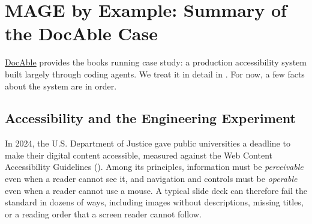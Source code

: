 



\chapter{MAGE by Example: Summary of the DocAble Case}


\href{\%7B\%7Bproduct_url\%7D\%7D}{DocAble} provides the book\textquotesingle s running case study: a production accessibility system built largely through coding agents. We treat it in detail in . For now, a few facts about the system are in order.

\section{Accessibility and the Engineering Experiment}\label{heading:accessibility-and-the-engineering-experiment}



In 2024, the U.S. Department of Justice gave public universities a deadline to make their digital content accessible, measured against the Web Content Accessibility Guidelines (). Among its principles, information must be \emph{perceivable} even when a reader cannot see it, and navigation and controls must be \emph{operable} even when a reader cannot use a mouse. A typical slide deck can therefore fail the standard in dozens of ways, including images without descriptions, missing titles, or a reading order that a screen reader cannot follow.

